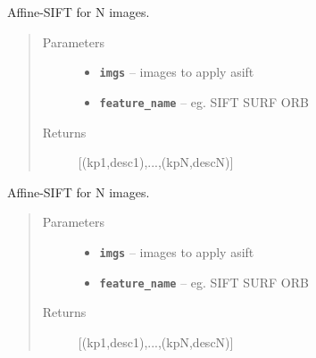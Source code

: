\documentclass[letterpaper,10pt,english]{sphinxmanual}
\begin{document}
\begin{fulllineitems}
\label{RRtoolbox.lib:RRtoolbox.lib.descriptors.ASIFT_iter}
Affine-SIFT for N images.
\begin{quote}\begin{description}
\item[{Parameters}] \leavevmode\begin{itemize}
\item {} 
\textbf{\texttt{imgs}} -- images to apply asift

\item {} 
\textbf{\texttt{feature\_name}} -- eg. SIFT SURF ORB

\end{itemize}

\item[{Returns}] \leavevmode
{[}(kp1,desc1),...,(kpN,descN){]}

\end{description}\end{quote}

\end{fulllineitems}


\begin{fulllineitems}
\label{RRtoolbox.lib:RRtoolbox.lib.descriptors.ASIFT_multiple}
Affine-SIFT for N images.
\begin{quote}\begin{description}
\item[{Parameters}] \leavevmode\begin{itemize}
\item {} 
\textbf{\texttt{imgs}} -- images to apply asift

\item {} 
\textbf{\texttt{feature\_name}} -- eg. SIFT SURF ORB

\end{itemize}

\item[{Returns}] \leavevmode
{[}(kp1,desc1),...,(kpN,descN){]}

\end{description}\end{quote}

\end{fulllineitems}
\end{document}
